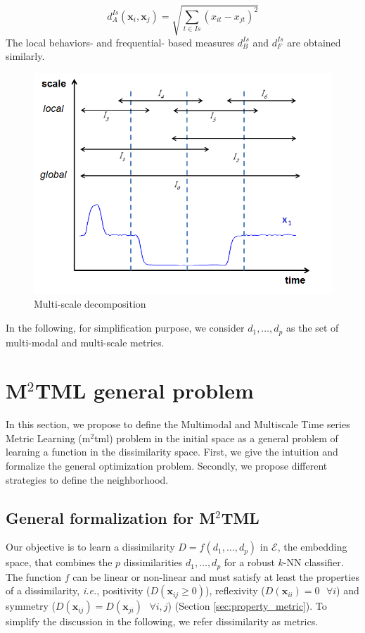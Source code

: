\begin{equation}	
d^{Is}_A(\textbf{x}_i,\textbf{x}_j) = \sqrt{\sum\limits_{t \in Is} (x_{it}-x_{jt})^2}
\label{eq:A2}
\end{equation}
The local behaviors- and frequential- based measures $d^{Is}_B$ and $d^{Is}_F$ are obtained similarly.
\begin{figure}[h!]
	\centering
	\includegraphics[width=0.6\linewidth]{images/Intervalles3}
	\caption{Multi-scale decomposition}
	\label{fig:Intervalles}
\end{figure}

\noindent In the following, for simplification purpose, we consider $d_1, \ldots, d_p$ as the set of multi-modal and multi-scale metrics.




\section{M$^2$TML general problem}
In this section, we propose to define the Multimodal and Multiscale Time series Metric Learning ({\sc m$^2$tml}) problem in the initial space as a general problem of learning a function in the dissimilarity space. First, we give the intuition and formalize the general optimization problem. Secondly, we propose different strategies to define the neighborhood.

\subsection{General formalization for M$^2$TML} 
Our objective is to learn a dissimilarity $D=f(d_1, \ldots, d_p)$ in $\mathcal{E}$, the embedding space, that combines the $p$ dissimilarities $d_1, \ldots, d_p$ for a robust $k$-NN classifier. The function $f$ can be linear or non-linear and must satisfy at least the properties of a dissimilarity, \textit{i.e.}, positivity ($D(\textbf{x}_{ij} \geq 0)$), reflexivity ($D(\textbf{x}_{ii})=0 \text{ }\forall i$) and symmetry ($D(\textbf{x}_{ij}) = D(\textbf{x}_{ji}) \text{ } \forall i,j$) (Section \ref{sec:property_metric}). To simplify the discussion in the following, we refer dissimilarity as metrics.

